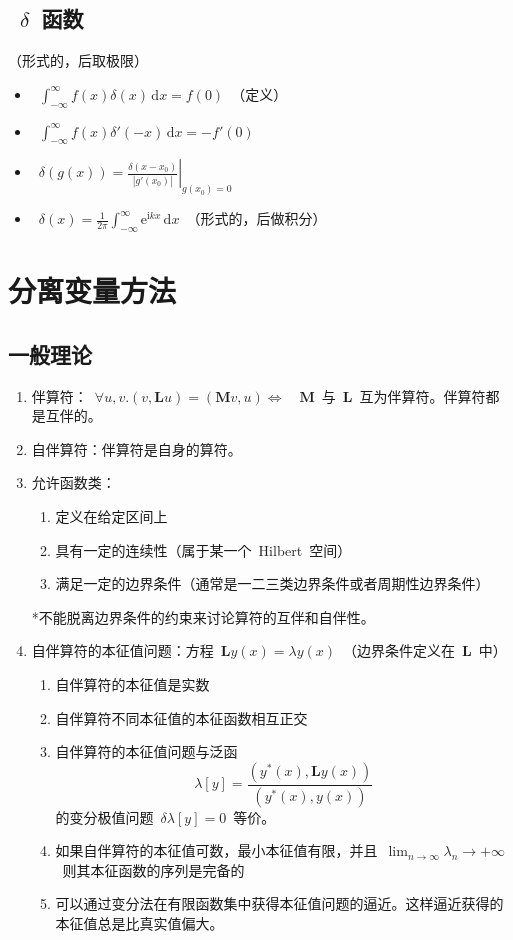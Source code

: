 \documentclass[12pt,a4paper]{article}
\newcommand\diff{\,\mathrm{d}}
\renewcommand{\[}{\ $\displaystyle}
\renewcommand{\]}{$\ }%
\newcommand\mi{\mathrm{i}}
\newcommand\e{\mathrm{e}}
\begin{document}
	 \subsection[delta~函数]{\[\delta\]函数}
	 （形式的，后取极限）
	 	\begin{itemize}
	 	  \item \[\int_{-\infty}^{\infty} f(x)\delta(x)\diff x = f(0)\]（定义）
	 	  \item \[\int_{-\infty}^{\infty}f(x)\delta'(-x)\diff x = -f'(0)\]
	 	  \item \[\delta(g(x)) = \left.\frac{\delta(x-x_0)}{|g'(x_0)|}\right|_{g(x_0) = 0}\]
	 	  \item \[\delta(x) = \frac{1}{2\pi}\int_{-\infty}^\infty \e^{\mi kx}\diff x\]（形式的，后做积分）
	 	\end{itemize}
	
\section{分离变量方法}
	\subsection{一般理论}
		\begin{enumerate}
		 \item 伴算符：\[\forall u,v.(v,\bm{L}u) = (\bm{M}v,u)\Leftrightarrow\]\[\bm M\]与\[\bm L\]互为伴算符。伴算符都是互伴的。
		 \item 自伴算符：伴算符是自身的算符。
		 \item 允许函数类：
		 	\begin{enumerate}
		 	  \item 定义在给定区间上
		 	  \item 具有一定的连续性（属于某一个~Hilbert~空间）
		 	  \item 满足一定的边界条件（通常是一二三类边界条件或者周期性边界条件）
		 	\end{enumerate}
		 	*不能脱离边界条件的约束来讨论算符的互伴和自伴性。
		 \item 自伴算符的本征值问题：方程\[\bm{L}y(x) = \lambda y(x)\]（边界条件定义在\[\bm L\]中）
		 	\begin{enumerate}
		 	 \item 自伴算符的本征值是实数
		 	 \item 自伴算符不同本征值的本征函数相互正交
		 	 \item 自伴算符的本征值问题与泛函
		 	 	$$
		 	 	  \lambda[y] = \frac{(y^*(x),\bm{L}y(x))}{(y^*(x),y(x))}
		 	 	$$
		 	 	的变分极值问题\[\delta \lambda[y] = 0\]等价。
		 	 \item 如果自伴算符的本征值可数，最小本征值有限，并且\[\lim_{n\to\infty}\lambda_n \to +\infty\]则其本征函数的序列是完备的
		 	 \item 可以通过变分法在有限函数集中获得本征值问题的逼近。这样逼近获得的本征值总是比真实值偏大。
		 	\end{enumerate}
		\end{enumerate}
\end{document}
